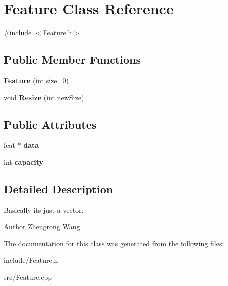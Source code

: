 \hypertarget{classFeature}{}\section{Feature Class Reference}
\label{classFeature}


{\ttfamily \#include $<$Feature.\+h$>$}

\subsection*{Public Member Functions}
\begin{DoxyCompactItemize}
\item 
\hypertarget{classFeature_a2b74be536afddf041660d4e7cf380a79}{}{\bfseries Feature} (int size=0)\label{classFeature_a2b74be536afddf041660d4e7cf380a79}

\item 
\hypertarget{classFeature_a91798da6497d0b3a2837d78daf246476}{}void {\bfseries Resize} (int new\+Size)\label{classFeature_a91798da6497d0b3a2837d78daf246476}

\end{DoxyCompactItemize}
\subsection*{Public Attributes}
\begin{DoxyCompactItemize}
\item 
\hypertarget{classFeature_ae90dde1871e9e81ce6b7b5f99080e4f3}{}feat $\ast$ {\bfseries data}\label{classFeature_ae90dde1871e9e81ce6b7b5f99080e4f3}

\item 
\hypertarget{classFeature_af4d2343cf558bf32746a777a2c272fac}{}int {\bfseries capacity}\label{classFeature_af4d2343cf558bf32746a777a2c272fac}

\end{DoxyCompactItemize}


\subsection{Detailed Description}
Basically it\textquotesingle{}s just a vector. \begin{DoxyAuthor}{Author}
Zhengrong Wang 
\end{DoxyAuthor}


The documentation for this class was generated from the following files\+:\begin{DoxyCompactItemize}
\item 
include/Feature.\+h\item 
src/Feature.\+cpp\end{DoxyCompactItemize}
